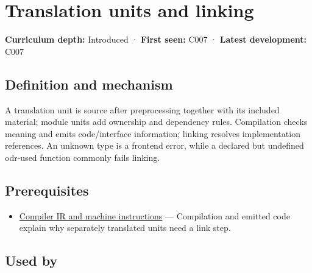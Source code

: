\hypertarget{appendix-806686359e1b}{}\label{referencestart:appendix-806686359e1b}
\section{Translation units and linking}\label{appendix-806686359e1b-translation-units-and-linking}

\hypertarget{appendix-806686359e1b-translation-units-and-linking}{}

\textbf{Curriculum depth:} Introduced · \textbf{First seen:} C007 · \textbf{Latest development:} C007

\begin{allmightroledefinition}

\subsection{Definition and mechanism}\label{appendix-806686359e1b-definition-and-mechanism}

\hypertarget{appendix-806686359e1b-definition-and-mechanism}{}

A translation unit is source after preprocessing together with its included material; module units add ownership and dependency rules. Compilation checks meaning and emits code/interface information; linking resolves implementation references. An unknown type is a frontend error, while a declared but undefined odr-used function commonly fails linking.

\end{allmightroledefinition}

\subsection{Prerequisites}\label{appendix-806686359e1b-prerequisites}

\hypertarget{appendix-806686359e1b-prerequisites}{}

\begin{itemize}
\tightlist
\item
  \hyperref[appendix-942ad41afb30]{Compiler IR and machine instructions} --- Compilation and emitted code explain why separately translated units need a link step.
\end{itemize}

\subsection{Used by}\label{appendix-806686359e1b-used-by}

